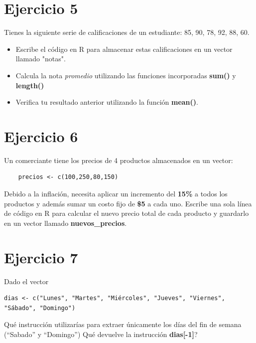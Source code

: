 \documentclass{article}
\begin{document}
\section*{Ejercicio 5}
Tienes la siguiente serie de calificaciones de un estudiante: 85, 90, 78, 92, 88, 60.
\begin{itemize}
    \item Escribe el código en R para almacenar estas calificaciones en un vector llamado "notas".
    \item Calcula la nota \textit{promedio} utilizando las funciones incorporadas \textbf{sum()} y \textbf{length()}
    \item Verifica tu resultado anterior utilizando la función \textbf{mean()}.
\end{itemize}

\section*{Ejercicio 6}
Un comerciante tiene los precios de 4 productos almacenados en un vector:
\begin{verbatim}
    precios <- c(100,250,80,150)
\end{verbatim}

Debido a la inflación, necesita aplicar un incremento del \textbf{15\%} a todos 
los productos y además sumar un costo fijo de \textbf{\$5} a cada uno. Escribe 
una sola línea de código en R para calcular el nuevo precio total 
de cada producto y guardarlo en un vector llamado \textbf{nuevos\_precios}.

\section*{Ejercicio 7}
Dado el vector
\begin{verbatim}
dias <- c("Lunes", "Martes", "Miércoles", "Jueves", "Viernes", 
"Sábado", "Domingo")
\end{verbatim}
\textquestiondown Qué instrucción utilizarías para extraer únicamente 
los días del fin de semana (``Sabado'' y ``Domingo'')
\textquestiondown Qué devuelve la instrucción \textbf{dias[-1]}?
\end{document}
